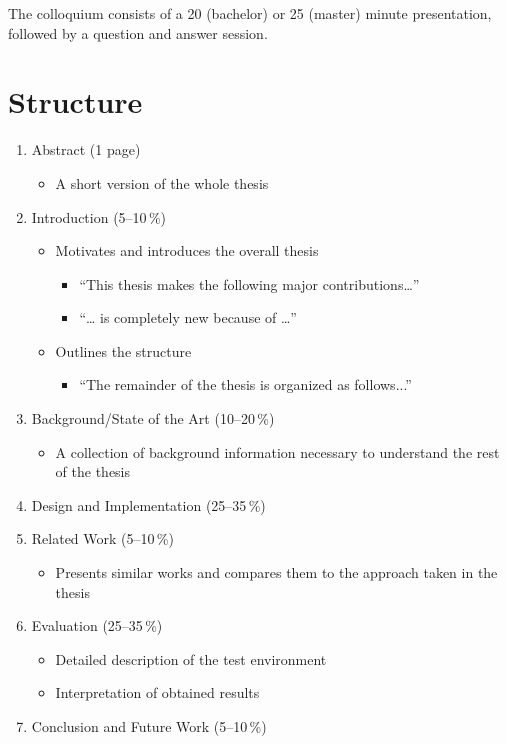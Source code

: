 \documentclass[
	12pt,
	a4paper,
	abstract,
	bibliography=totoc,
	chapterprefix,
	headings=openright,
	numbers=endperiod,
	parskip=half,
	twoside,
]{scrreprt}
\begin{document}
The colloquium consists of a 20 (bachelor) or 25 (master) minute presentation, followed by a question and answer session.

\section{Structure}

\begin{enumerate}
	\item Abstract (1 page)
	\begin{itemize}
		\item A short version of the whole thesis
	\end{itemize}
	\item Introduction (5--10\,\%)
	\begin{itemize}
		\item Motivates and introduces the overall thesis
		\begin{itemize}
			\item “This thesis makes the following major contributions…”
			\item “… is completely new because of …”
		\end{itemize}
		\item Outlines the structure
		\begin{itemize}
			\item “The remainder of the thesis is organized as follows...”
		\end{itemize}
	\end{itemize}
	\item Background/State of the Art (10--20\,\%)
	\begin{itemize}
		\item A collection of background information necessary to understand the rest of the thesis
	\end{itemize}
	\item Design and Implementation (25--35\,\%)
	\item Related Work (5--10\,\%)
	\begin{itemize}
		\item Presents similar works and compares them to the approach taken in the thesis
	\end{itemize}
	\item Evaluation (25--35\,\%)
	\begin{itemize}
		\item Detailed description of the test environment
		\item Interpretation of obtained results
	\end{itemize}
	\item Conclusion and Future Work (5--10\,\%)
\end{enumerate}
\end{document}
